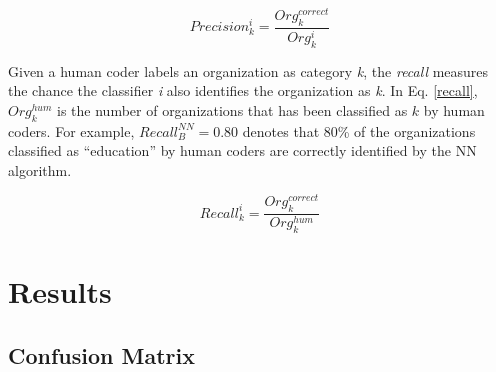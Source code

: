 \documentclass[12pt]{article}
\begin{document}
\begin{equation} \label{precision}
    Precision^{i}_{k}=\frac{Org^{correct}_{k}}{Org^{i}_{k}}
\end{equation}

Given a human coder labels an organization as category \textit{k}, the \textit{recall} measures the chance the classifier \textit{i} also identifies the organization as \textit{k}. In Eq. \ref{recall}, $Org^{hum}_{k}$ is the number of organizations that has been classified as $k$ by human coders. For example, $Recall^{NN}_{B}=0.80$ denotes that 80\% of the organizations classified as ``education'' by human coders are correctly identified by the NN algorithm.

\begin{equation} \label{recall}
    Recall^{i}_{k}=\frac{Org^{correct}_{k}}{Org^{hum}_{k}}
\end{equation}


\section{Results}

\subsection{Confusion Matrix}



\singlespacing
\printbibliography
\end{document}
